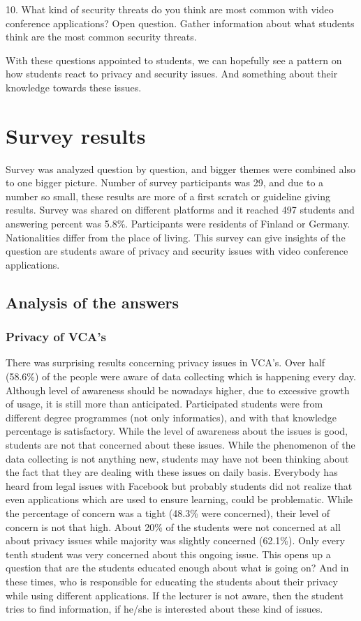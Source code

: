 \documentclass[utf8,english]{gradu3}
\begin{document}
10. What kind of security threats do you think are most common with video conference applications? Open question. Gather information about what students think are the most common security threats.

With these questions appointed to students, we can hopefully see a pattern on how students react to privacy and security issues. And something about their knowledge towards these issues. 

\chapter{Survey results}
\label{surveyresults}
Survey was analyzed question by question, and bigger themes were combined also to one bigger picture. Number of survey participants was 29, and due to a number so small, these results are more of a first scratch or guideline giving results. Survey was shared on different platforms and it reached 497 students and answering percent was 5.8\%. Participants were residents of Finland or Germany. Nationalities differ from the place of living. This survey can give insights of the question are students aware of privacy and security issues with video conference applications.

\section{Analysis of the answers}
\subsection{Privacy of VCA's}
There was surprising results concerning privacy issues in VCA's. Over half (58.6\%) of the people were aware of data collecting which is happening every day. Although level of awareness should be nowadays higher, due to excessive growth of usage, it is still more than anticipated. Participated students were from different degree programmes (not only informatics), and with that knowledge percentage is satisfactory. While the level of awareness about the issues is good, students are not that concerned about these issues. While the phenomenon of the data collecting is not anything new, students may have not been thinking about the fact that they are dealing with these issues on daily basis. Everybody has heard from legal issues with Facebook \parencite{fbData} but probably students did not realize that even applications which are used to ensure learning, could be problematic. While the percentage of concern was a tight (48.3\% were concerned), their level of concern is not that high. About 20\% of the students were not concerned at all about privacy issues while majority was slightly concerned (62.1\%). Only every tenth student was very concerned about this ongoing issue. This opens up a question that are the students educated enough about what is going on? And in these times, who is responsible for educating the students about their privacy while using different applications. If the lecturer is not aware, then the student tries to find information, if he/she is interested about these kind of issues. 
\end{document}
